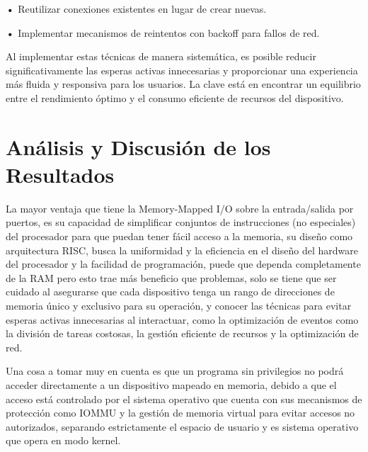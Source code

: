 \documentclass{article}
\begin{document}
\textbf{    •} { Reutilizar conexiones existentes en lugar de crear nuevas.}

\textbf{    •} { Implementar mecanismos de reintentos con backoff para fallos de red.}

\quad

{Al implementar estas técnicas de manera sistemática, es posible reducir significativamente las esperas activas innecesarias y proporcionar una experiencia más fluida y responsiva para los usuarios. La clave está en encontrar un equilibrio entre el rendimiento óptimo y el consumo eficiente de recursos del dispositivo.}

\quad
\newpage






\section{Análisis y Discusión de los Resultados}

{La mayor ventaja que tiene la Memory-Mapped I/O  sobre la entrada/salida por puertos, es su capacidad de simplificar conjuntos de instrucciones (no especiales) del procesador para que puedan tener fácil acceso a la memoria, su diseño como arquitectura RISC, busca la uniformidad y la eficiencia en el diseño del hardware del procesador y la facilidad de programación, puede que dependa completamente de la RAM pero esto trae más beneficio que problemas, solo se tiene que ser cuidado al asegurarse que cada dispositivo tenga un rango de direcciones de memoria único y exclusivo para su operación, y conocer las técnicas  para evitar esperas activas innecesarias al interactuar, como la optimización de eventos como la división de tareas costosas, la gestión eficiente de recursos y la optimización de red.}

\quad

{Una cosa a tomar muy en cuenta es que un programa sin privilegios no podrá acceder directamente a un dispositivo mapeado en memoria, debido a que el acceso está controlado por el sistema operativo que cuenta con sus mecanismos de protección como IOMMU y la gestión de memoria virtual para evitar accesos no autorizados, separando estrictamente el espacio de usuario y es sistema operativo que opera en modo kernel.}

\quad
\newpage
\end{document}
